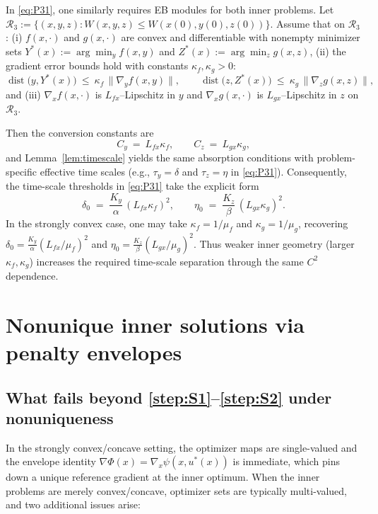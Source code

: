 \documentclass{article}
\newcommand{\1}{\mathbf{1}}
\begin{document}
In \ref{eq:P31}, one similarly requires EB modules for both inner problems.
Let $\mathcal R_3:=\{(x,y,z): W(x,y,z)\le W(x(0),y(0),z(0))\}$.
Assume that on $\mathcal R_3$:
(i) $f(x,\cdot)$ and $g(x,\cdot)$ are convex and differentiable with nonempty minimizer sets
$Y^*(x):=\arg\min_y f(x,y)$ and $Z^*(x):=\arg\min_z g(x,z)$,
(ii) the gradient error bounds hold with constants $\kappa_f,\kappa_g>0$:
\[
\operatorname{dist}\bigl(y,Y^*(x)\bigr)\ \le\ \kappa_f\,\|\nabla_y f(x,y)\|,
\qquad
\operatorname{dist}\bigl(z,Z^*(x)\bigr)\ \le\ \kappa_g\,\|\nabla_z g(x,z)\|,
\]
and (iii) $\nabla_x f(x,\cdot)$ is $L_{fx}$--Lipschitz in $y$ and $\nabla_x g(x,\cdot)$ is $L_{gx}$--Lipschitz in $z$
on $\mathcal R_3$.

Then the conversion constants are
\[
C_y\ =\ L_{fx}\kappa_f,
\qquad
C_z\ =\ L_{gx}\kappa_g,
\]
and Lemma~\ref{lem:timescale} yields the same absorption conditions with problem-specific effective time scales
(e.g., $\tau_y=\delta$ and $\tau_z=\eta$ in \ref{eq:P31}). 
Consequently, the time-scale thresholds in \ref{eq:P31} take the explicit form
\[
\delta_0 \;=\; \frac{K_y}{\alpha}\,(L_{fx}\kappa_f)^2,
\qquad
\eta_0 \;=\; \frac{K_z}{\beta}\,(L_{gx}\kappa_g)^2.
\]
In the strongly convex case, one may take $\kappa_f=1/\mu_f$ and $\kappa_g=1/\mu_g$, recovering
$\delta_0=\frac{K_y}{\alpha}(L_{fx}/\mu_f)^2$ and $\eta_0=\frac{K_z}{\beta}(L_{gx}/\mu_g)^2$.
Thus weaker inner geometry (larger $\kappa_f,\kappa_g$) increases the required time-scale separation through the same $C^2$ dependence.




\section{Nonunique inner solutions via penalty envelopes}\label{app:nonunique-penalty}

\subsection{What fails beyond \ref{step:S1}--\ref{step:S2} under nonuniqueness}\label{app:nonunique-why}
In the strongly convex/concave setting, the optimizer maps are single-valued and the envelope identity
$\nabla \Phi(x)=\nabla_x\psi(x,u^*(x))$ is immediate, which pins down a unique reference gradient at the inner optimum.
When the inner problems are merely convex/concave, optimizer sets are typically multi-valued, and two additional issues arise:
\end{document}
